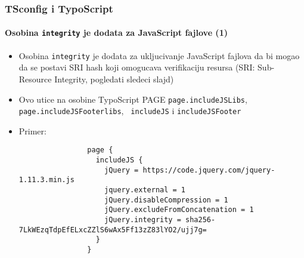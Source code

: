 \begin{frame}[fragile]
	\frametitle{TSconfig i TypoScript}
	\framesubtitle{Osobina \texttt{integrity} je dodata za JavaScript fajlove (1)}

	\lstset{basicstyle=\tiny\ttfamily}

	\begin{itemize}

		\item Osobina \texttt{integrity} je dodata za ukljucivanje JavaScript fajlova
			 da bi mogao da se postavi SRI hash koji omogucava verifikaciju resursa\newline
			(SRI: Sub-Resource Integrity, pogledati sledeci slajd)

		\item Ovo utice na osobine TypoScript PAGE \texttt{page.includeJSLibs},
			\texttt{page.includeJSFooterlibs}, \texttt{ includeJS} i \texttt{includeJSFooter}

		\item Primer:

			\begin{lstlisting}
				page {
				  includeJS {
				    jQuery = https://code.jquery.com/jquery-1.11.3.min.js
				    jquery.external = 1
				    jQuery.disableCompression = 1
				    jQuery.excludeFromConcatenation = 1
				    jQuery.integrity = sha256-7LkWEzqTdpEfELxcZZlS6wAx5Ff13zZ83lYO2/ujj7g=
				  }
				}
			\end{lstlisting}

	\end{itemize}

\end{frame}


